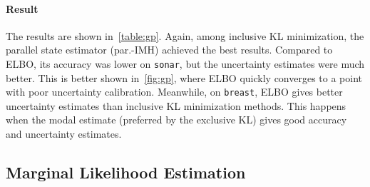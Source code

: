 \paragraph{Result}
The results are shown in~\cref{table:gp}.
Again, among inclusive KL minimization, the parallel state estimator (par.-IMH) achieved the best results.
Compared to ELBO, its accuracy was lower on \texttt{sonar}, but the uncertainty estimates were much better.
This is better shown in~\cref{fig:gp}, where ELBO quickly converges to a point with poor uncertainty calibration.
Meanwhile, on \texttt{breast}, ELBO gives better uncertainty estimates than inclusive KL minimization methods.
This happens when the modal estimate (preferred by the exclusive KL) gives good accuracy and uncertainty estimates.

  \vspace{-0.05in}
\subsection{Marginal Likelihood Estimation}\label{section:mll}
  \vspace{-0.05in}
